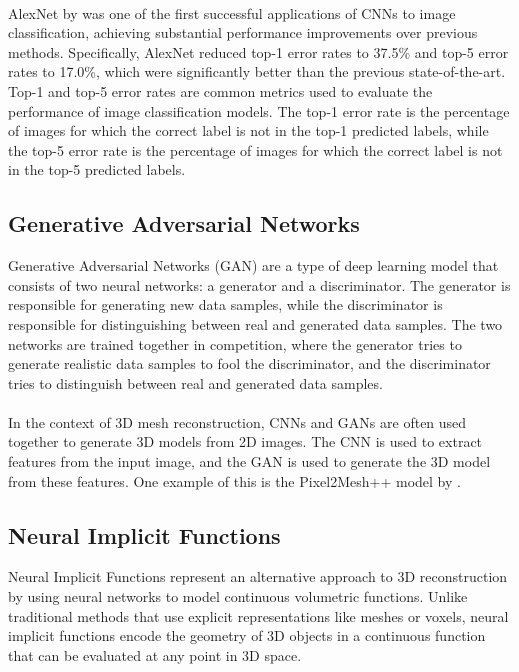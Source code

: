 \paragraph{}
AlexNet by \textcite{krizhevsky_imagenet_2012} was one of the first successful applications of CNNs to image classification, achieving substantial performance improvements over previous methods. Specifically, AlexNet reduced top-1 error rates to 37.5\% and top-5 error rates to 17.0\%, which were significantly better than the previous state-of-the-art.
Top-1 and top-5 error rates are common metrics used to evaluate the performance of image classification models. The top-1 error rate is the percentage of images for which the correct label is not in the top-1 predicted labels, while the top-5 error rate is the percentage of images for which the correct label is not in the top-5 predicted labels.

\subsection{Generative Adversarial Networks} \label{section:gans}
Generative Adversarial Networks (GAN) \autocite{goodfellow_generative_2014} are a type of deep learning model that consists of two neural networks: a generator and a discriminator. The generator is responsible for generating new data samples, while the discriminator is responsible for distinguishing between real and generated data samples. The two networks are trained together in competition, where the generator tries to generate realistic data samples to fool the discriminator, and the discriminator tries to distinguish between real and generated data samples.
\paragraph{}
In the context of 3D mesh reconstruction, CNNs and GANs are often used together to generate 3D models from 2D images. The CNN is used to extract features from the input image, and the GAN is used to generate the 3D model from these features. One example of this is the Pixel2Mesh++ model by \textcite{wen_pixel2mesh_2019}.

\subsection{Neural Implicit Functions}
Neural Implicit Functions represent an alternative approach to 3D reconstruction by using neural networks to model continuous volumetric functions. Unlike traditional methods that use explicit representations like meshes or voxels, neural implicit functions encode the geometry of 3D objects in a continuous function that can be evaluated at any point in 3D space.

